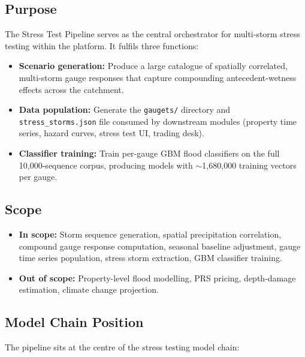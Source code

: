 \documentclass[11pt,a4paper]{article}
\begin{document}
\mkmpurpose

\subsection{Purpose}
The Stress Test Pipeline serves as the central orchestrator for multi-storm
stress testing within the platform. It fulfils three functions:

\begin{itemize}[nosep]
    \item \textbf{Scenario generation:} Produce a large catalogue of spatially
          correlated, multi-storm gauge responses that capture compounding
          antecedent-wetness effects across the catchment.
    \item \textbf{Data population:} Generate the \texttt{gaugets/} directory and
          \texttt{stress\_storms.json} file consumed by downstream modules
          (property time series, hazard curves, stress test UI, trading desk).
    \item \textbf{Classifier training:} Train per-gauge GBM flood classifiers
          on the full 10{,}000-sequence corpus, producing models with
          $\sim$1{,}680{,}000 training vectors per gauge.
\end{itemize}

\subsection{Scope}
\begin{itemize}[nosep]
    \item \textbf{In scope:} Storm sequence generation, spatial precipitation
          correlation, compound gauge response computation, seasonal baseline
          adjustment, gauge time series population, stress storm extraction,
          GBM classifier training.
    \item \textbf{Out of scope:} Property-level flood modelling, PRS pricing,
          depth-damage estimation, climate change projection.
\end{itemize}

\subsection{Model Chain Position}
\label{sec:model_chain}
The pipeline sits at the centre of the stress testing model chain:
\end{document}
